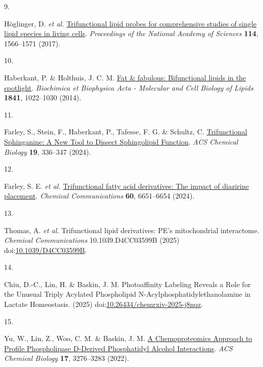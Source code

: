 \documentclass[
  letterpaper,
  DIV=11,
  numbers=noendperiod]{scrartcl}
\newlength{\cslhangindent}
\newlength{\csllabelwidth}
\newenvironment{CSLReferences}[2] %
 {\begin{list}{}{%
  \setlength{\itemindent}{0pt}
  \setlength{\leftmargin}{0pt}
  \setlength{\parsep}{0pt}
  \ifodd #1
   \setlength{\leftmargin}{\cslhangindent}
   \setlength{\itemindent}{-1\cslhangindent}
  \fi
  \setlength{\itemsep}{#2\baselineskip}}}
 {\end{list}}
\newcommand{\CSLLeftMargin}[1]{\parbox[t]{\csllabelwidth}{\strut#1\strut}}
\newcommand{\CSLRightInline}[1]{\parbox[t]{\linewidth - \csllabelwidth}{\strut#1\strut}}
\begin{document}
\begin{CSLReferences}{0}{0}
\CSLLeftMargin{9. }%
\CSLRightInline{Höglinger, D. \emph{et al.}
\href{https://doi.org/10.1073/pnas.1611096114}{Trifunctional lipid
probes for comprehensive studies of single lipid species in living
cells}. \emph{Proceedings of the National Academy of Sciences}
\textbf{114}, 1566--1571 (2017).}

\CSLLeftMargin{10. }%
\CSLRightInline{Haberkant, P. \& Holthuis, J. C. M.
\href{https://doi.org/10.1016/j.bbalip.2014.01.003}{Fat \& fabulous:
{Bifunctional} lipids in the spotlight}. \emph{Biochimica et Biophysica
Acta - Molecular and Cell Biology of Lipids} \textbf{1841}, 1022--1030
(2014).}

\CSLLeftMargin{11. }%
\CSLRightInline{Farley, S., Stein, F., Haberkant, P., Tafesse, F. G. \&
Schultz, C.
\href{https://doi.org/10.1021/acschembio.3c00554}{Trifunctional
{Sphinganine}: {A New Tool} to {Dissect Sphingolipid Function}}.
\emph{ACS Chemical Biology} \textbf{19}, 336--347 (2024).}

\CSLLeftMargin{12. }%
\CSLRightInline{Farley, S. E. \emph{et al.}
\href{https://doi.org/10.1039/D4CC00974F}{Trifunctional fatty acid
derivatives: The impact of diazirine placement}. \emph{Chemical
Communications} \textbf{60}, 6651--6654 (2024).}

\CSLLeftMargin{13. }%
\CSLRightInline{Thomas, A. \emph{et al.} Trifunctional lipid
derivatives: {PE}'s mitochondrial interactome. \emph{Chemical
Communications} 10.1039.D4CC03599B (2025)
doi:\href{https://doi.org/10.1039/D4CC03599B}{10.1039/D4CC03599B}.}

\CSLLeftMargin{14. }%
\CSLRightInline{Chiu, D.-C., Lin, H. \& Baskin, J. M. Photoaffinity
{Labeling Reveals} a {Role} for the {Unusual Triply Acylated
Phospholipid N-Acylphosphatidylethanolamine} in {Lactate Homeostasis}.
(2025)
doi:\href{https://doi.org/10.26434/chemrxiv-2025-j8nqz}{10.26434/chemrxiv-2025-j8nqz}.}

\CSLLeftMargin{15. }%
\CSLRightInline{Yu, W., Lin, Z., Woo, C. M. \& Baskin, J. M.
\href{https://doi.org/10.1021/acschembio.1c00584}{A {Chemoproteomics
Approach} to {Profile Phospholipase D-Derived Phosphatidyl Alcohol
Interactions}}. \emph{ACS Chemical Biology} \textbf{17}, 3276--3283
(2022).}


\end{CSLReferences}
\end{document}
